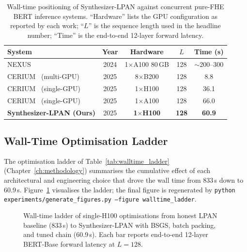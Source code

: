 \begin{table}[htbp]
\centering
\caption{Wall-time positioning of Synthesizer-LPAN against concurrent pure-FHE BERT inference systems. ``Hardware'' lists the GPU configuration as reported by each work; ``$L$'' is the sequence length used in the headline number; ``Time'' is the end-to-end 12-layer forward latency.}
\label{tab:slpan_sota}
\begin{tabular}{lcccc}
\toprule
\textbf{System} & \textbf{Year} & \textbf{Hardware} & \textbf{$L$} & \textbf{Time (s)} \\
\midrule
NEXUS~\cite{zhang2024nexus}                & 2024 & 1$\times$A100 80\,GB         & 128 & $\sim$200--300 \\
CERIUM~\cite{cerium2025} (multi-GPU)       & 2025 & 8$\times$B200                & 128 & 8.8 \\
CERIUM~\cite{cerium2025} (single-GPU)      & 2025 & 1$\times$H100                & 128 & 36.1 \\
CERIUM~\cite{cerium2025} (single-GPU)      & 2025 & 1$\times$A100                & 128 & 66.0 \\
\textbf{Synthesizer-LPAN (Ours)}           & 2025 & \textbf{1$\times$H100}       & \textbf{128} & \textbf{60.9} \\
\bottomrule
\end{tabular}
\end{table}

\subsection{Wall-Time Optimisation Ladder}
The optimisation ladder of Table~\ref{tab:walltime_ladder} (Chapter~\ref{ch:methodology}) summarises the cumulative effect of each architectural and engineering choice that drove the wall time from $833$\,s down to $60.9$\,s. Figure~\ref{fig:walltime_ladder} visualises the ladder; the final figure is regenerated by \texttt{python experiments/generate\_figures.py --figure walltime\_ladder}.

\begin{figure}[htbp]
\centering
{}
\caption{Wall-time ladder of single-H100 optimisations from honest LPAN baseline (833\,s) to Synthesizer-LPAN with BSGS, batch packing, and tuned chain (60.9\,s). Each bar reports end-to-end 12-layer BERT-Base forward latency at $L = 128$.}
\label{fig:walltime_ladder}
\end{figure}

